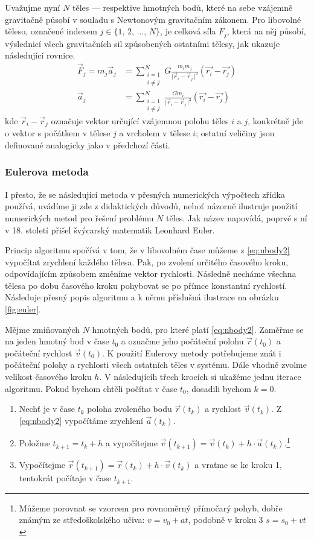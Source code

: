 \documentclass[A4paper, 12pt, oneside]{book}
\newcommand{\abs}[1]{\lvert #1 \,\rvert}
\begin{document}
Uvažujme nyní $N$ těles --- respektive hmotných bodů, které na sebe vzájemně gravitačně působí v souladu s Newtonovým gravitačním zákonem. Pro libovolné těleso, označené indexem $j\in\{1,\,2,\,\dots,\,N\}$, je celková síla $F_j$, která na něj působí, výslednicí všech gravitačních sil způsobených ostatními tělesy, jak ukazuje následující rovnice.
\begin{align} 
	\vec{F}_j = m_j\vec{a}_j &= \sum_{\substack{i=1 \\ i\neq j}}^N G\frac{m_im_j}{\abs{\vec{r}_i-\vec{r}_j}^3}(\vec{r_i}-\vec{r_j}) \label{eq:nbody1}\\
		\vec{a}_j &= \sum_{\substack{i=1 \\ i\neq j}}^N \frac{Gm_i}{\abs{\vec{r}_i-\vec{r}_j}^3}(\vec{r_i}-\vec{r_j}) \label{eq:nbody2}
\end{align}
kde $\vec{r}_i-\vec{r}_j$ označuje vektor určující vzájemnou polohu těles $i$ a $j$, konkrétně jde o vektor s počátkem v tělese $j$ a vrcholem v tělese $i$; ostatní veličiny jsou definované analogicky jako v předchozí části.
\subsubsection{Eulerova metoda}
I přesto, že se následující metoda v přesných numerických výpočtech zřídka používá, uvádíme ji zde z didaktických důvodů, neboť názorně ilustruje použití numerických metod pro řešení problému $N$ těles. Jak název napovídá, poprvé s ní v 18. století přišel švýcarský matematik Leonhard Euler.

Princip algoritmu spočívá v tom, že v libovolném čase můžeme z \eqref{eq:nbody2} vypočítat zrychlení každého tělesa. Pak, po zvolení určitého časového kroku, odpovídajícím způsobem změníme vektor rychlosti. Následně necháme všechna tělesa po dobu časového kroku pohybovat se po přímce konstantní rychlostí. Následuje přesný popis algoritmu a k němu příslušná ilustrace na obrázku \ref{fig:euler}.

Mějme zmiňovaných $N$ hmotných bodů, pro které platí \eqref{eq:nbody2}. Zaměřme se na jeden hmotný bod v čase $t_0$ a označme jeho počáteční polohu $\vec{r}(t_0)$ a počáteční rychlost $\vec{v}(t_0)$. K použití Eulerovy metody potřebujeme znát i počáteční polohy a rychlosti všech ostatních těles v systému. Dále vhodně zvolme velikost časového kroku $h$. V následujícíh třech krocích si ukažéme jednu iterace algoritmu. Pokud bychom chtěli počítat v čase $t_0$, dosadili bychom $k=0$.
\begin{enumerate}
	\item Nechť je v čase $t_k$ poloha zvoleného bodu $\vec{r}(t_k)$ a rychlost $\vec{v}(t_k)$. Z \eqref{eq:nbody2} vypočítáme zrychlení $\vec{a}(t_k)$. 
	\item Položme $t_{k+1} = t_{k}+h$ a vypočítejme $\vec{v}(t_{k+1}) = \vec{v}(t_k) + h\cdot\vec{a}(t_k)$.\footnote{Můžeme porovnat se vzorcem pro rovnoměrný přímočarý pohyb, dobře známým ze středoškolského učiva: $v = v_0 + at$, podobně v kroku 3 $s = s_0 + vt$}
	\item Vypočítejme $\vec{r}(t_{k+1}) = \vec{r}(t_k) + h\cdot\vec{v}(t_k)$ a vraťme se ke kroku 1, tentokrát počítaje v čase $t_{k+1}$. 
\end{enumerate}
\end{document}

